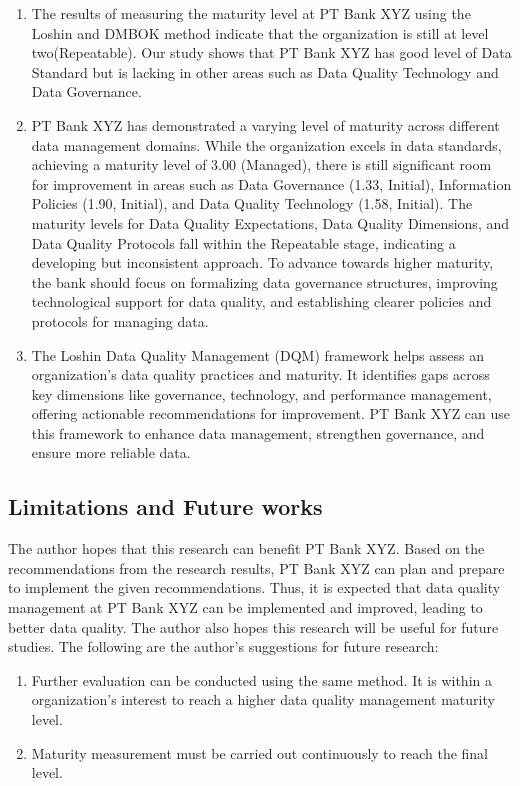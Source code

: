 \documentclass[conference]{IEEEtran}
\begin{document}
\begin{enumerate}
    \item The results of measuring the maturity level at PT Bank XYZ using the Loshin and DMBOK method \cite{loshin_dqi}\cite{DAMA_2013} indicate that the organization is still at level two(Repeatable). Our study shows that PT Bank XYZ has good level of Data Standard but is lacking in other areas such as Data Quality Technology and Data Governance.
    \item PT Bank XYZ has demonstrated a varying level of maturity across different data management domains. While the organization excels in data standards, achieving a maturity level of 3.00 (Managed), there is still significant room for improvement in areas such as Data Governance (1.33, Initial), Information Policies (1.90, Initial), and Data Quality Technology (1.58, Initial). The maturity levels for Data Quality Expectations, Data Quality Dimensions, and Data Quality Protocols fall within the Repeatable stage, indicating a developing but inconsistent approach. To advance towards higher maturity, the bank should focus on formalizing data governance structures, improving technological support for data quality, and establishing clearer policies and protocols for managing data.
    \item The Loshin Data Quality Management (DQM) framework helps assess an organization's data quality practices and maturity. It identifies gaps across key dimensions like governance, technology, and performance management, offering actionable recommendations for improvement. PT Bank XYZ can use this framework to enhance data management, strengthen governance, and ensure more reliable data.
\end{enumerate}


\subsection{Limitations and Future works}

The author hopes that this research can benefit PT Bank XYZ. Based on the recommendations from the research results, PT Bank XYZ can plan and prepare to implement the given recommendations. Thus, it is expected that data quality management at PT Bank XYZ can be implemented and improved, leading to better data quality. The author also hopes this research will be useful for future studies. The following are the author's suggestions for future research: 
\begin{enumerate}
    \item Further evaluation can be conducted using the same method. It is within a organization's interest to reach a higher data quality management maturity level.
    \item Maturity measurement must be carried out continuously to reach the final level.
\end{enumerate}
\end{document}
